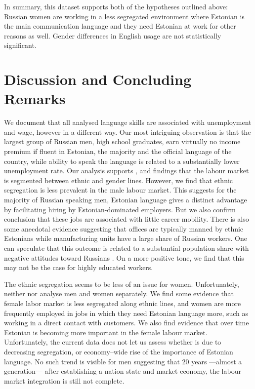 \documentclass[12pt, a4paper]{article}
\begin{document}
In summary, this dataset supports both of the hypotheses outlined above: Russian women are
working in a less segregated environment where Estonian is the main
communication language and they need Estonian at work for other reasons as
well. Gender differences in English usage are not statistically
significant.


\section{Discussion and Concluding Remarks}
\label{sec:discussion}

We document that all analysed language skills are associated with
unemployment and wage, however in a different way. Our most
intriguing observation is that the largest group of
Russian men, high school graduates, earn virtually no income premium if fluent in Estonian,
the majority and the official language of the country, while ability
to speak the language is related to a substantially
lower unemployment rate.
Our analysis supports \citet{YaoandOurs2015}, and \citet{Lindemann2013} findings that 
the labour market is segmented between ethnic and gender lines.
However, we find that ethnic segregation is less prevalent in the male
labour market.
This suggests for the majority of Russian speaking men, Estonian
language gives a distinct advantage by facilitating hiring by
Estonian-dominated employers. But we also confirm
\citet{leppik+vihalemm2015JofBaltStud} conclusion that
these
jobs are associated with little career mobility. There is also some
anecdotal evidence suggesting that offices are
typically manned by ethnic Estonians while manufacturing units have a
large share of Russian workers.
One can speculate that this outcome is related to a substantial population share
with negative attitudes toward Russians \citep{korts2009JofBaltStud}.
On a more positive tone, we find
that this may not be the case for highly educated workers.

The ethnic segregation seems to be less of an issue for women.
Unfortunately, neither \citet{Toomet2011} nor
\citet{leppik+vihalemm2015JofBaltStud} analyse men and women
separately. We find some evidence that female labor market is less
segregated along ethnic lines, and women are more frequently employed in jobs in which they need Estonian
language more, such as working in a direct contact with customers.
We also find evidence that over time Estonian is becoming more
important in the female labour market. Unfortunately, the current data
does not let us assess whether is due to decreasing segregation, or
economy--wide rise of the importance of Estonian language. No such trend is visible for
men suggesting that 20 years ---almost a generation--- after
establishing a nation state and market economy, the
labour market integration is still not complete.
\end{document}
